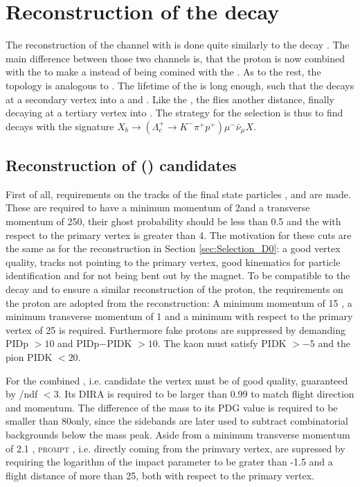 \section{Reconstruction of the decay \LbToLcmunu}
The reconstruction of the \LbToLcmunu channel with \LcTopKpi is done quite similarly to the decay \LbToDpmunuX.
The main difference between those two channels is, that the proton is now combined with the \Km\pip to make a \LcTopKpi instead of being comined with the \Dz\mun.
As to the rest, the topology is analogous to \LbToDpmunuX.
The lifetime of the \Lb is long enough, such that the \Lb decays at a secondary vertex into a \Lc and \mun.
Like the \Dz, the \Lc flies another distance, finally decaying at a tertiary vertex into \pKpi.
The strategy for the selection is thus to find decays with the signature $X_{b} \rightarrow (\Lambda_c^+ \rightarrow K^- \pi^+ p^+) \mu^- \bar{\nu}_{\mu} X$.

\subsection{Reconstruction of \Lc (\pKpi) candidates}
First of all, requirements on the tracks of the final state particles \proton, \kaon and \pion are made.
These are required to have a minimum momentum of 2\gev and a transverse momentum of 250\mev, their ghost probability should be less than 0.5 and the \chisqip with respect to the primary vertex is greater than 4.
The motivation for these cuts are the same as for the \Dz reconstruction in Section \ref{sec:Selection_D0}:
a good vertex quality, tracks not pointing to the primary vertex, good kinematics for particle identification and for not being bent out by the magnet.
To be compatible to the \LbToDpmunuX decay and to ensure a similar reconstruction of the proton, the requirements on the proton are adopted from the \LbToDpmunuX reconstruction:
A minimum momentum of 15 \gev, a minimum transverse momentum of 1 \gev and a minimum \chisqip with respect to the primary vertex of 25 is required.
Furthermore fake protons are suppressed by demanding PIDp $> 10$ and PIDp$-$PIDK $> 10$.
The kaon must satisfy PIDK $>-5$ and the pion PIDK $< 20$.

For the combined \pKpi, i.e. \Lc candidate the vertex must be of good quality, guaranteed by \chisqvtx/ndf $< 3$.
Its DIRA is required to be larger than 0.99 to match flight direction and momentum.
The difference of the \Lc mass to its PDG value is required to be smaller than 80\mev only, since the \Lc sidebands are later used to subtract combinatorial backgrounds below the \Lc mass peak.
Aside from a minimum transverse momentum of 2.1 \gev, \textsc{prompt} \Lc, i.e. \Lc directly coming from the primvary vertex, are supressed by requiring the logarithm of the \Lc impact parameter to be grater than -1.5 and a flight distance \chisq of more than 25, both with respect to the primary vertex.


